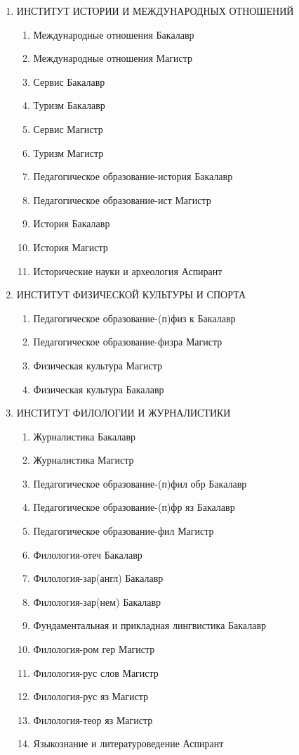 \begin{enumerate}
\item ИНСТИТУТ ИСТОРИИ И МЕЖДУНАРОДНЫХ ОТНОШЕНИЙ
\begin{enumerate}
\item Международные отношения	Бакалавр
\item Международные отношения	Магистр
\item Сервис	Бакалавр
\item Туризм	Бакалавр
\item Сервис	Магистр
\item Туризм	Магистр
\item Педагогическое образование-история	Бакалавр
\item Педагогическое образование-ист	Магистр
\item История	Бакалавр
\item История	Магистр
\item Исторические науки и археология	Аспирант
\end{enumerate}

\item ИНСТИТУТ ФИЗИЧЕСКОЙ КУЛЬТУРЫ И СПОРТА
\begin{enumerate}
\item Педагогическое образование-(п)физ к	Бакалавр
\item Педагогическое образование-физра	Магистр
\item Физическая культура	Магистр
\item Физическая культура	Бакалавр
\end{enumerate}

\item ИНСТИТУТ ФИЛОЛОГИИ И ЖУРНАЛИСТИКИ
\begin{enumerate}
\item Журналистика	Бакалавр
\item Журналистика	Магистр
\item Педагогическое образование-(п)фил обр	Бакалавр
\item Педагогическое образование-(п)фр яз	Бакалавр
\item Педагогическое образование-фил	Магистр
\item Филология-отеч	Бакалавр
\item Филология-зар(англ)	Бакалавр
\item Филология-зар(нем)	Бакалавр
\item Фундаментальная и прикладная лингвистика	Бакалавр
\item Филология-ром гер	Магистр
\item Филология-рус слов	Магистр
\item Филология-рус яз	Магистр
\item Филология-теор яз	Магистр
\item Языкознание и литературоведение	Аспирант
\end{enumerate}


\end{enumerate}
